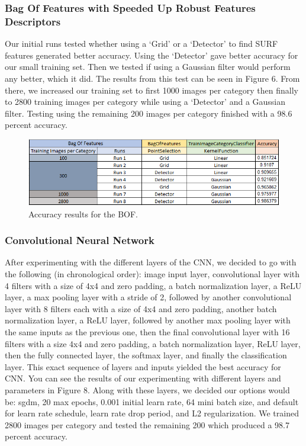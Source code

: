 \documentclass[conference]{IEEEtran}
\begin{document}
\subsubsection{Bag Of Features with Speeded Up Robust Features Descriptors}
Our initial runs tested whether using a ‘Grid’ or a ‘Detector’ to find SURF features generated better accuracy. Using the ‘Detector’ gave better accuracy for our small training set. Then we tested if using a Gaussian filter would perform any better, which it did. The results from this test can be seen in Figure 6. From there, we increased our training set to first 1000 images per category then finally to 2800 training images per category while using a ‘Detector’ and a Gaussian filter. Testing using the remaining 200 images per category finished with a 98.6 percent accuracy.
\begin{figure}[h]
\centering
\includegraphics[width=\linewidth]{SURFSVM}
\caption{Accuracy results for the BOF.}
\end{figure}

\subsubsection{Convolutional Neural Network}
After experimenting with the different layers of the CNN, we decided to go with the following (in chronological order): image input layer, convolutional layer with 4 filters with a size of 4x4 and zero padding, a batch normalization layer, a ReLU layer, a max pooling layer with a stride of 2, followed by another convolutional layer with 8 filters each with a size of 4x4 and zero padding, another batch normalization layer, a ReLU layer, followed by another max pooling layer with the same inputs as the previous one, then the final convolutional layer with 16 filters with a size 4x4 and zero padding, a batch normalization layer, ReLU layer, then the fully connected layer, the softmax layer, and finally the classification layer. This exact sequence of layers and inputs yielded the best accuracy for CNN. You can see the results of our experimenting with different layers and parameters in Figure 8. Along with these layers, we decided our options would be: sgdm, 20 max epochs, 0.001 initial learn rate, 64 mini batch size, and default for learn rate schedule, learn rate drop period, and L2 regularization. We trained 2800 images per category and tested the remaining 200 which produced a 98.7 percent accuracy.
\end{document}
